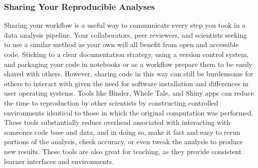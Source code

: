 \documentclass[10pt,letterpaper]{article}
\begin{document}
\subsubsection*{Sharing Your Reproducible Analyses} 
Sharing your workflow is a useful way to communicate every step you took in a data analysis pipeline. 
Your collaborators, peer reviewers, and scientists seeking to use a similar method as your own will all benefit from open and accessible code. 
Sticking to a clear documentation strategy, using a version control system, and packaging your code in notebooks or as a workflow prepare them to be easily shared with others. 
However, sharing code in this way can still be burdensome for others to interact with given the need for software installation and differences in user operating systems. 
Tools like Binder, Whole Tale, and Shiny apps can reduce the time to reproduction by other scientists by constructing controlled environments identical to those in which the original computation was performed. 
These tools substantially reduce overhead associated with interacting with someones code base and data, and in doing so, make it fast and easy to rerun portions of the analysis, check accuracy, or even tweak the analysis to produce new results. 
These tools are also great for teaching, as they provide consistent learner interfaces and environments. 



\end{document}
